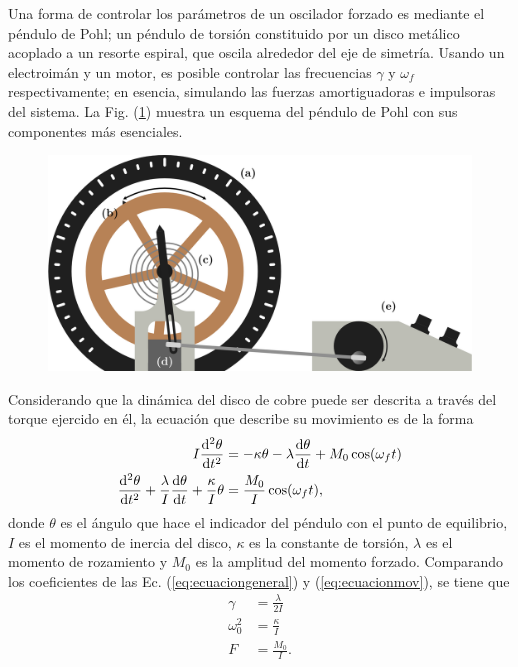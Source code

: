 Una forma de controlar los parámetros de un oscilador forzado es mediante el péndulo de Pohl;
un péndulo de torsión constituido por un disco metálico acoplado a un resorte espiral, que oscila
alrededor del eje de simetría. Usando un electroimán y un motor, es posible controlar las
frecuencias $\gamma$ y $\omega_f$ respectivamente; en esencia, simulando las fuerzas
amortiguadoras e impulsoras del sistema. La Fig. (\ref{fig:POHL}) muestra un esquema del 
péndulo de Pohl con sus componentes más esenciales.
\begin{figure}[H]
	\centering
	\includegraphics[width=\linewidth]{res/POHLFORZADO.png}
	\label{fig:POHL}
\end{figure}
Considerando que la dinámica del disco de cobre puede ser descrita a través del torque ejercido
en él, la ecuación que describe su movimiento es de la forma
\begin{align}
	I\dv[2]{\theta}{t} &= -\kappa\theta - \lambda\dv{\theta}{t} + M_0\cos(\omega_f t) \nonumber \\
	\dv[2]{\theta}{t} + \frac{\lambda}{I}\dv{\theta}{t} + \frac{\kappa}{I}\theta &= \frac{M_0}{I}\cos(\omega_f t), \label{eq:ecuacionmov}
\end{align}
donde $\theta$ es el ángulo que hace el indicador del péndulo con el punto de equilibrio, $I$
es el momento de inercia del disco, $\kappa$ es la constante de torsión, $\lambda$ es el momento
de rozamiento y $M_0$ es la amplitud del momento forzado. Comparando los coeficientes de las
Ec. (\ref{eq:ecuaciongeneral}) y (\ref{eq:ecuacionmov}), se tiene que
\begin{align*}
	\gamma &= \frac{\lambda}{2I} \\
	\omega_0^2 &= \frac{\kappa}{I} \\
	F &= \frac{M_0}{I}.
\end{align*}

